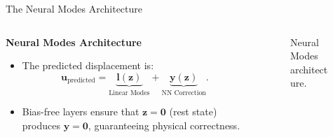 \documentclass[9pt]{beamer}
\begin{document}
\begin{frame}{The Neural Modes Architecture}
    
    \begin{columns}[T]
        \begin{column}{0.6\textwidth}
            \textbf{Neural Modes Architecture}
            \begin{itemize}
                \item The predicted displacement is:
                \begin{equation*}
                    \bm{u}_{\text{predicted}} = \underbrace{\bm{l}(\mathbf{z})}_{\text{Linear Modes}} + \underbrace{\bm{y}(\mathbf{z})}_{\text{NN Correction}}.
                \end{equation*}
                \item Bias-free layers ensure that \(\mathbf{z}=\bm{0}\) (rest state) produces \(\bm{y}=\bm{0}\), guaranteeing physical correctness.
            \end{itemize}
        \end{column}
        
        \begin{column}{0.4\textwidth}
            \begin{figure}
                \centering
                \caption{Neural Modes architecture.}
                \label{fig:neural_modes_arch}
            \end{figure}
        \end{column}
    \end{columns}
\end{frame}
\end{document}
